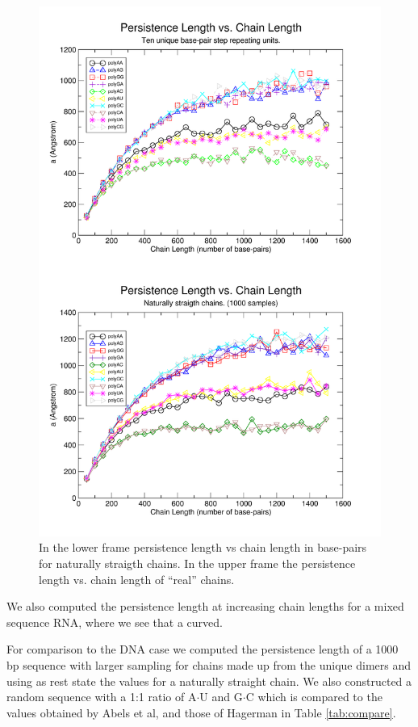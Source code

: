 \begin{figure}
\centering
\includegraphics[angle=0, scale=2.8]{Chapter4/perVlen.png}
\caption{In the lower frame persistence length vs chain length in
  base-pairs for naturally straigth chains. In the upper frame the
  persistence length vs. chain length of ``real'' chains.}
\label{fig:perVlen}
\end{figure}


We also computed the persistence length at increasing chain lengths
for a mixed sequence RNA, where we see that a curved.

For comparison to the DNA case we computed the persistence length of a
1000 bp sequence with larger sampling for chains made up from the
unique dimers and using as rest state the values for a naturally
straight chain. We also constructed a random sequence with a
1:1 ratio of A$\cdot$U and G$\cdot$C which is compared to the
values obtained by Abels et al, and those of Hagerman in Table
\ref{tab:compare}. 




